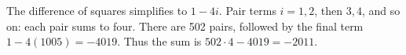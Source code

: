 The difference of squares simplifies to $1-4i$. Pair terms $i=1,2$, then $3,4$, and so on: each pair sums to four. There are 502 pairs, followed by the final term $1-4(1005)=-4019$. Thus the sum is $502\cdot4-4019=\boxed{-2011}$.
